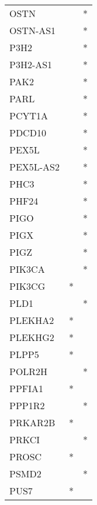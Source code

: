 \begin{longtable}{lcc}
OSTN             &                &          * \\
OSTN-AS1         &                &          * \\
P3H2             &                &          * \\
P3H2-AS1         &                &          * \\
PAK2             &                &          * \\
PARL             &                &          * \\
PCYT1A           &                &          * \\
PDCD10           &                &          * \\
PEX5L            &                &          * \\
PEX5L-AS2        &                &          * \\
PHC3             &                &          * \\
PHF24            &                &          * \\
PIGO             &                &          * \\
PIGX             &                &          * \\
PIGZ             &                &          * \\
PIK3CA           &                &          * \\
PIK3CG           &              * &            \\
PLD1             &                &          * \\
PLEKHA2          &              * &            \\
PLEKHG2          &              * &            \\
PLPP5            &              * &            \\
POLR2H           &                &          * \\
PPFIA1           &              * &            \\
PPP1R2           &                &          * \\
PRKAR2B          &              * &            \\
PRKCI            &                &          * \\
PROSC            &              * &            \\
PSMD2            &                &          * \\
PUS7             &              * &            \\

\end{longtable}
